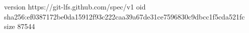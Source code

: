 version https://git-lfs.github.com/spec/v1
oid sha256:ef0387172be0da15912f93c222caa39a67de31ce7596830c9dbcc1f5cda521fc
size 87544
